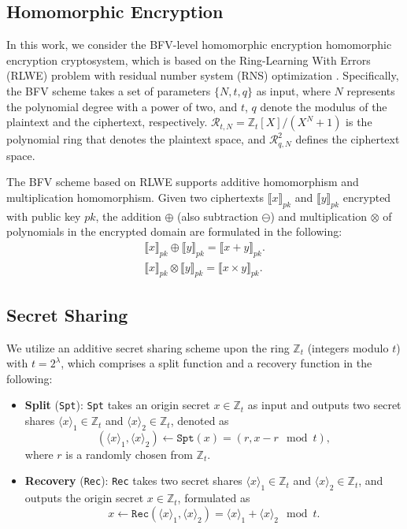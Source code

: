 \documentclass[conference]{IEEEtran}
\newcommand{\Spt}{\texttt{Spt}}
\newcommand{\Rec}{\texttt{Rec}}
\begin{document}
\subsection{Homomorphic Encryption}\label{HE}
In this work, we consider the BFV-level homomorphic encryption homomorphic encryption cryptosystem, which is based on the Ring-Learning With Errors (RLWE) problem with residual number system (RNS) optimization \cite{bajard2016full}. Specifically, the BFV scheme takes a set of parameters $\{N, t, q\}$ as input, where $N$ represents the polynomial degree with a power of two, and $t$, $q$ denote the modulus of the plaintext and the ciphertext, respectively. $\mathcal{R}_{t,N} = \mathbb{Z}_t [X]/(X^N + 1)$ is the polynomial ring that denotes the plaintext space, and $\mathcal{R}_{q, N}^2$ defines the ciphertext space.

The BFV scheme based on RLWE supports additive homomorphism and multiplication homomorphism. Given two ciphertexts $\llbracket x \rrbracket_{pk}$ and $\llbracket y \rrbracket_{pk}$ encrypted with public key $pk$, the addition $\oplus$ (also subtraction $\ominus$) and multiplication $\otimes$ of polynomials in the encrypted domain are formulated in the following:
\begin{equation*}
\begin{array}{c}
    \llbracket x \rrbracket_{pk} \oplus \llbracket y \rrbracket_{pk} = \llbracket x + y \rrbracket_{pk}. \\
    \llbracket x \rrbracket_{pk} \otimes \llbracket y \rrbracket_{pk} = \llbracket x \times y \rrbracket_{pk}.    
\end{array}
\end{equation*}

\subsection{Secret Sharing}\label{SS}
We utilize an additive secret sharing scheme upon the ring $\mathbb{Z}_t$ (integers modulo $t$) with $t = 2^\lambda$, which comprises a split function and a recovery function in the following:
\begin{itemize}
\item \textbf{Split} (\Spt): \texttt{Spt} takes an origin secret $x \in \mathbb{Z}_t$ as input and outputs two secret shares $\langle x \rangle_1 \in \mathbb{Z}_t$ and $\langle x \rangle_2 \in \mathbb{Z}_t$, denoted as
\begin{equation}
    (\langle x \rangle_1, \langle x \rangle_2) \gets \Spt(x) = (r, x - r\!\!\!\mod t),
\end{equation}
where $r$ is a randomly chosen from $\mathbb{Z}_t$.

\item \textbf{Recovery} (\Rec): \texttt{Rec} takes two secret shares $\langle x \rangle_1 \in \mathbb{Z}_t$ and $\langle x \rangle_2 \in \mathbb{Z}_t$, and outputs the origin secret $x \in \mathbb{Z}_t$, formulated as
\begin{equation}
     x \gets \Rec(\langle x \rangle_1, \langle x \rangle_2) = \langle x \rangle_1 + \langle x \rangle_2\!\!\!\mod t.
\end{equation}
\end{itemize}
\end{document}
